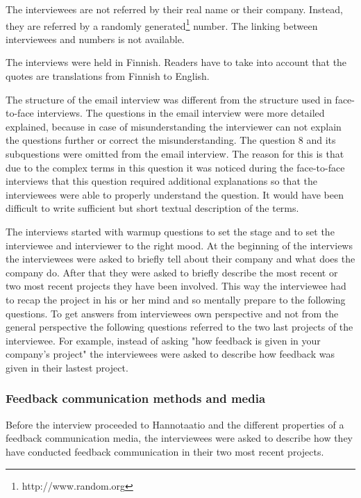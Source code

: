 \documentclass[english,12pt,a4paper,pdftex]{article}
\begin{document}
The interviewees are not referred by their real name or their company. Instead, they are referred by a randomly generated\footnote{http://www.random.org} number. The linking between interviewees and numbers is not available.

The interviews were held in Finnish. Readers have to take into account that the quotes are translations from Finnish to English.


The structure of the email interview was different from the structure used in face-to-face interviews. The questions in the email interview were more detailed explained, because in case of misunderstanding the interviewer can not explain the questions further or correct the misunderstanding. The question 8 and its subquestions were omitted from the email interview. The reason for this is that due to the complex terms in this question it was noticed during the face-to-face interviews that this question required additional explanations so that the interviewees were able to properly understand the question. It would have been difficult to write sufficient but short textual description of the terms.

The interviews started with warmup questions to set the stage and to set the interviewee and interviewer to the right mood. At the beginning of the interviews the interviewees were asked to briefly tell about their company and what does the company do. After that they were asked to briefly describe the most recent or two most recent projects they have been involved. This way the interviewee had to recap the project in his or her mind and so mentally prepare to the following questions. To get answers from interviewees own perspective and not from the general perspective the following questions referred to the two last projects of the interviewee. For example, instead of asking "how feedback is given in your company's project" the interviewees were asked to describe how feedback was given in their lastest project.

\subsubsection{Feedback communication methods and media}

Before the interview proceeded to Hannotaatio and the different properties of a feedback communication media, the interviewees were asked to describe how they have conducted feedback communication in their two most recent projects.
\end{document}
